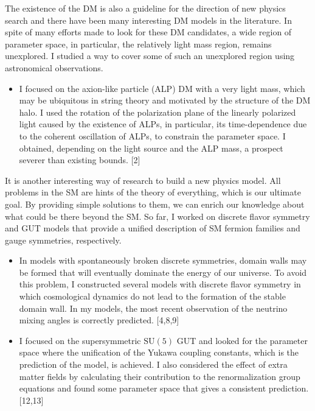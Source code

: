 \documentclass[12pt,notitlepage]{article}
\begin{document}
The existence of the DM is also a guideline for the direction of new physics search and there have been many interesting DM models in the literature.
In spite of many efforts made to look for these DM candidates, a wide region of parameter space, in particular, the relatively light mass region, remains unexplored.
I studied a way to cover some of such an unexplored region using astronomical observations.
\vspace{-1.3mm}
\begin{itemize}
  \setlength{\parskip}{0mm}
  \setlength{\itemsep}{1mm}
  \item
    I focused on the axion-like particle (ALP) DM with a very light mass, which may be ubiquitous in string theory and motivated by the structure of the DM halo.
    I used the rotation of the polarization plane of the linearly polarized light caused by the existence of ALPs, in particular, its time-dependence due to the coherent oscillation of ALPs, to constrain the parameter space.
    I obtained, depending on the light source and the ALP mass, a prospect severer than existing bounds. [2]
\end{itemize}

It is another interesting way of research to build a new physics model.
All problems in the SM are hints of the theory of everything, which is our ultimate goal.
By providing simple solutions to them, we can enrich our knowledge about what could be there beyond the SM.
So far, I worked on discrete flavor symmetry and GUT models that provide a unified description of SM fermion families and gauge symmetries, respectively.
\vspace{-1.3mm}
\begin{itemize}
  \setlength{\parskip}{0mm}
  \setlength{\itemsep}{1mm}
  \item
    In models with spontaneously broken discrete symmetries, domain walls may be formed that will eventually dominate the energy of our universe.
    To avoid this problem, I constructed several models with discrete flavor symmetry in which cosmological dynamics do not lead to the formation of the stable domain wall.
    In my models, the most recent observation of the neutrino mixing angles is correctly predicted. [4,8,9]
  \item
    I focused on the supersymmetric $\mathrm{SU}(5)$ GUT and looked for the parameter space where the unification of the Yukawa coupling constants, which is the prediction of the model, is achieved.
    I also considered the effect of extra matter fields by calculating their contribution to the renormalization group equations and found some parameter space that gives a consistent prediction. [12,13]
\end{itemize}
\end{document}
